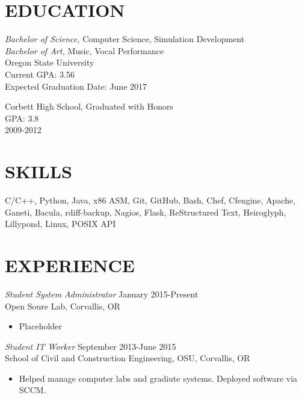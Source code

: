 \documentclass[line,margin]{res}
\begin{document}
\address{404 NW 12th Street, Corvallis, OR 97330, (503) -758-6952}
\address{tfahl.com, github.com/fahlmant, fahlmantaylor@gmail.com}
\begin{resume}
 
\section{EDUCATION}
                    {\sl Bachelor of Science,} Computer Science, Simulation Development \\
                    {\sl Bachelor of Art,} Music, Vocal Performance \\
                    Oregon State University\\
                    Current GPA: 3.56\\
                    Expected Graduation Date: June 2017 
                    
                    Corbett High School,
                    Graduated with Honors\\
                    GPA: 3.8\\
                    2009-2012
\section{SKILLS}
                    C/C++, Python, Java, x86 ASM, Git, GitHub, Bash, Chef, Cfengine, Apache, Ganeti, Bacula, rdiff-backup,
                    Nagios, Flask, ReStructured Text, Heiroglyph, Lillypond,
                    Linux, POSIX API
\section{EXPERIENCE}
                    {\sl Student System Administrator} \hfill January 2015-Present \\
                    Open Soure Lab, 
                    Corvallis, OR
                    \begin{itemize}  \itemsep -2pt %
                       \item Placeholder
                    \end{itemize}
 
                    {\sl Student IT Worker} \hfill September 2013-June 2015 \\
                    School of Civil and Construction Engineering, OSU, 
                    Corvallis, OR 
                    \begin{itemize}  \itemsep -2pt %
                       \item Helped manage computer labs and gradiute systems. Deployed software via SCCM.
                    \end{itemize} 


\end{resume}
\end{document}
